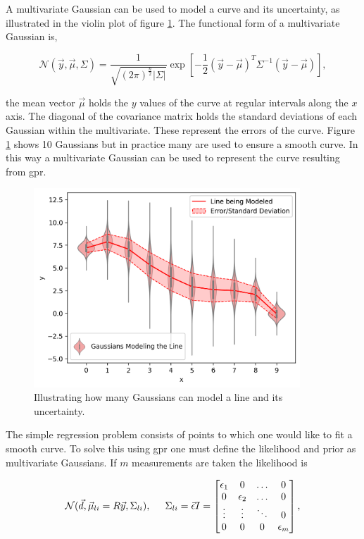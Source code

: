 A multivariate Gaussian can be used to model a curve and its uncertainty, as illustrated in the violin plot of figure \ref{fig:mvg}. The functional form of a multivariate Gaussian is,

\begin{equation}
  \mathcal{N}(\vec y, \vec{\mu}, \Sigma) = \frac{1}{\sqrt{(2\pi)^{\frac{n}{2}}|\Sigma|}} \exp \left[{{-\frac{1}{2}(\vec{y}-\vec{\mu})^T\Sigma^{-1}(\vec{y}-\vec{\mu})}}\right],
  \label{eq:mvg}
\end{equation}

\noindent the mean vector $\vec{\mu}$ holds the $y$ values of the curve at regular intervals along the $x$ axis. The diagonal of the covariance matrix holds the standard deviations of each Gaussian within the multivariate. These represent the errors of the curve. Figure \ref{fig:mvg} shows 10 Gaussians but in practice many are used to ensure a smooth curve. In this way a multivariate Gaussian can be used to represent the curve resulting from \gls{gpr}.

\begin{figure}
  \centering
  \includegraphics[width=10cm]{images/mvg.png}
  \caption{Illustrating how many Gaussians can model a line and its uncertainty.}
  \label{fig:mvg}
\end{figure}

The simple regression problem consists of points to which one would like to fit a smooth curve. To solve this using \gls{gpr} one must define the likelihood and prior as multivariate Gaussians. If $m$ measurements are taken the likelihood is

\begin{equation}
  \mathcal{N}(\vec{d}, \vec \mu_{li} = R\vec{y}, \Sigma_{li}),\hspace{0.5cm} \Sigma_{li} = \vec{\epsilon}I = 
    \begin{bmatrix}
        \epsilon_1 & 0 & \hdots & 0\\
        0 & \epsilon_2 & \hdots & 0\\
        \vdots & \vdots & \ddots & 0 \\
        0 & 0 & 0 &\epsilon_m
    \end{bmatrix},
  \label{eq:likelihood}
\end{equation}

